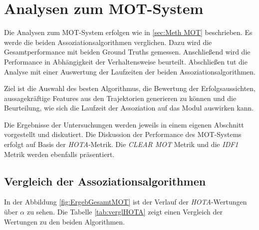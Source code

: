 \section{Analysen zum MOT-System}\label{sec:Ergebnisse MOT}
Die Analysen zum MOT-System erfolgen wie in \autoref{sec:Meth MOT} beschrieben. Es werde die beiden Assoziationsalgorithmen verglichen. Dazu wird die Gesamtperformance mit beiden Ground Truths gemessen. Anschließend wird die Performance in Abhängigkeit der Verhaltensweise beurteilt. Abschließen tut die Analyse mit einer Auswertung der Laufzeiten der beiden Assoziationsalgorithmen. \par

Ziel ist die Auswahl des besten Algorithmus, die Bewertung der Erfolgsaussichten, aussagekräftige Features aus den Trajektorien generieren zu können und die Beurteilung, wie sich die Laufzeit der Assoziation auf das Modul auswirken kann. \par

Die Ergebnisse der Untersuchungen werden jeweils in einem eigenen Abschnitt vorgestellt und diskutiert. Die Diskussion der Performance des MOT-Systems erfolgt auf Basis der \textit{HOTA}-Metrik. Die \textit{CLEAR MOT} Metrik und die \textit{IDF1} Metrik werden ebenfalls präsentiert. 


\subsection{Vergleich der Assoziationsalgorithmen}

In der Abbildung \ref{fig:ErgebGesamtMOT} ist der Verlauf der \textit{HOTA}-Wertungen über \(\alpha\) zu sehen. Die Tabelle \ref{tab:verglHOTA} zeigt einen Vergleich der Wertungen zu den beiden Algorithmen.

